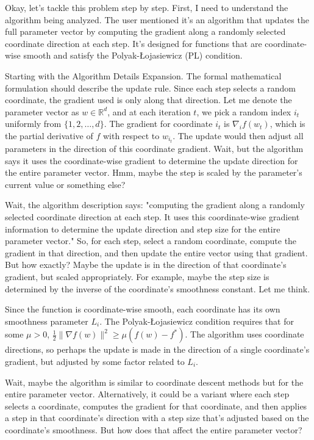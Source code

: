\documentclass{article}
\begin{document}
Okay, let's tackle this problem step by step. First, I need to understand the algorithm being analyzed. The user mentioned it's an algorithm that updates the full parameter vector by computing the gradient along a randomly selected coordinate direction at each step. It's designed for functions that are coordinate-wise smooth and satisfy the Polyak-Łojasiewicz (PL) condition.

Starting with the Algorithm Details Expansion. The formal mathematical formulation should describe the update rule. Since each step selects a random coordinate, the gradient used is only along that direction. Let me denote the parameter vector as \( w \in \mathbb{R}^d \), and at each iteration \( t \), we pick a random index \( i_t \) uniformly from \( \{1, 2, \ldots, d\} \). The gradient for coordinate \( i_t \) is \( \nabla_i f(w_t) \), which is the partial derivative of \( f \) with respect to \( w_{i_t} \). The update would then adjust all parameters in the direction of this coordinate gradient. Wait, but the algorithm says it uses the coordinate-wise gradient to determine the update direction for the entire parameter vector. Hmm, maybe the step is scaled by the parameter's current value or something else?

Wait, the algorithm description says: "computing the gradient along a randomly selected coordinate direction at each step. It uses this coordinate-wise gradient information to determine the update direction and step size for the entire parameter vector." So, for each step, select a random coordinate, compute the gradient in that direction, and then update the entire vector using that gradient. But how exactly? Maybe the update is in the direction of that coordinate's gradient, but scaled appropriately. For example, maybe the step size is determined by the inverse of the coordinate's smoothness constant. Let me think.

Since the function is coordinate-wise smooth, each coordinate has its own smoothness parameter \( L_i \). The Polyak-Łojasiewicz condition requires that for some \( \mu > 0 \), \( \frac{1}{2}\|\nabla f(w)\|^2 \geq \mu (f(w) - f^*) \). The algorithm uses coordinate directions, so perhaps the update is made in the direction of a single coordinate's gradient, but adjusted by some factor related to \( L_i \).

Wait, maybe the algorithm is similar to coordinate descent methods but for the entire parameter vector. Alternatively, it could be a variant where each step selects a coordinate, computes the gradient for that coordinate, and then applies a step in that coordinate's direction with a step size that's adjusted based on the coordinate's smoothness. But how does that affect the entire parameter vector?
\end{document}
